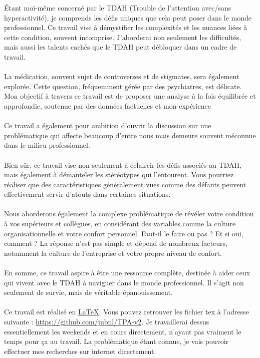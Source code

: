 Étant moi-même concerné par le TDAH (Trouble de l'attention avec/sans hyperactivité), je comprends les défis uniques que cela peut poser dans le monde professionnel. Ce travail vise à démystifier les complexités et les nuances liées à cette condition, souvent incomprise. J'aborderai non seulement les difficultés, mais aussi les talents cachés que le TDAH peut débloquer dans un cadre de travail.
\\
\\
La médication, souvent sujet de controverses et de stigmates, sera également explorée. Cette question, fréquemment gérée par des psychiatres, est délicate. Mon objectif à travers ce travail est de proposer une analyse à la fois équilibrée et approfondie, soutenue par des données factuelles et mon expérience 
\\
\\
Ce travail a également pour ambition d'ouvrir la discussion sur une problématique qui affecte beaucoup d'entre nous mais demeure souvent méconnue dans le milieu professionnel.
\\
\\
Bien sûr, ce travail vise non seulement à éclaircir les défis associés au TDAH, mais également à démanteler les stéréotypes qui l'entourent. Vous pourriez réaliser que des caractéristiques généralement vues comme des défauts peuvent effectivement servir d'atouts dans certaines situations.
\\
\\
Nous aborderons également la complexe problématique de révéler votre condition à vos supérieurs et collègues, en considérant des variables comme la culture organisationnelle et votre confort personnel. Faut-il le faire ou pas ? Et si oui, comment ? La réponse n'est pas simple et dépend de nombreux facteurs, notamment la culture de l'entreprise et votre propre niveau de confort.
\\
\\
En somme, ce travail aspire à être une ressource complète, destinée à aider ceux qui vivent avec le TDAH à naviguer dans le monde professionnel. Il s'agit non seulement de survie, mais de véritable épanouissement.
\\
\\
Ce travail est réalisé en \href{https://www.latex-project.org/}{LaTeX}. Vous pouvez retrouver les fichier tex à l'adresse suivante : \href{https://github.com/jubnl/TPA-v2}{https://github.com/jubnl/TPA-v2}. Je travaillerai dessus essentiellement les weekends et en cours directement, n'ayant pas vraiment le temps pour ça au travail. La problématique étant connue, je vais pouvoir effectuer mes recherches sur internet directement.